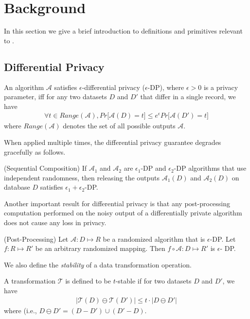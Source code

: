 
\section{Background}\label{sec:background}
In this section we give a brief introduction to definitions and primitives relevant to \system. 

\subsection{Differential Privacy}
\begin{definition} \label{def:dp}
An algorithm $\mathcal{A}$
satisfies $\epsilon$-differential privacy ($\epsilon$-DP), where $\epsilon > 0$ is a privacy parameter, iff
 for any two datasets $D$ and $D'$ that differ in a single record, we have
\begin{gather}
\forall t \in Range(\mathcal{A}), Pr \big[\mathcal{A}(D) = t\big] \leq e^{\epsilon}Pr\big[\mathcal{A}(D') = t\big]
\end{gather}
where $Range(\mathcal{A})$ denotes the set of all possible outputs
$\mathcal{A}$.
\end{definition} 
When applied multiple times, the differential privacy guarantee degrades gracefully as follows.
\begin{theorem}(Sequential Composition) \label{theorem:seq}
If $\mathcal{A}_1$ and
$\mathcal{A}_2$ are $\epsilon_1$-DP and $\epsilon_2$-DP algorithms that use independent randomness, then releasing the outputs $\mathcal{A}_1(D)$ and
$\mathcal{A}_2(D)$ on database $D$ satisfies $\epsilon_1+\epsilon_2$-DP.\end{theorem} 
Another important result for differential privacy is that any post-processing computation performed on the noisy output of a differentially private algorithm does not cause any loss in privacy.
\begin{theorem}(Post-Processing)\label{post}
Let $\mathcal{A}: D \mapsto R$ be a randomized
algorithm that is $\epsilon$-DP. Let $f : R \mapsto R'$ be an
arbitrary randomized mapping. Then $f \circ \mathcal{A} : D \mapsto R'$ is $\epsilon$-
DP. \end{theorem}
We also define the \emph{stability} of a data transformation operation.
\begin{definition}\label{def:stability}
A transformation $\mathcal{T}$ is defined to be $t$-stable if for two datasets $D$ and $D'$, we have\begin{gather}|\mathcal{T}(D)\ominus \mathcal{T}(D')| \leq t \cdot |D\ominus D'|  \end{gather} where  (i.e.,  $D \ominus D' = (D-D') \cup (D'-D)$. \end{definition}
